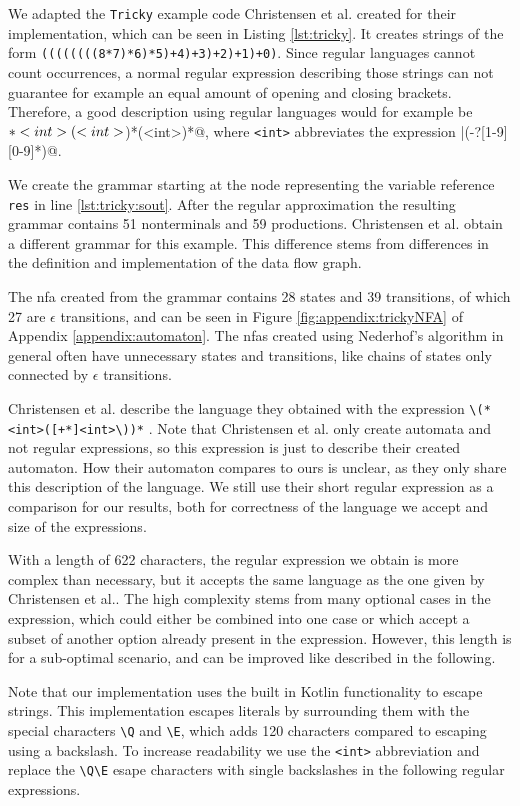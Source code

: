 We adapted the \lstinline|Tricky| example code Christensen et al. \cite{brics} created for their implementation, which can be seen in Listing \ref{lst:tricky}. It creates strings of the form \lstinline|((((((((8*7)*6)*5)+4)+3)+2)+1)+0)|. Since regular languages cannot count occurrences, a normal regular expression describing those strings can not guarantee for example an equal amount of opening and closing brackets. Therefore, a good description using regular languages would for example be \Verb@\(*<int>(\*<int>\))*(\+<int>\))*@, where \Verb|<int>| abbreviates the expression |(-?[1-9][0-9]*)@.

We create the grammar starting at the node representing the variable reference \lstinline|res| in line \ref{lst:tricky:sout}.
After the regular approximation the resulting grammar contains 51 nonterminals and 59 productions.
Christensen et al. obtain a different grammar for this example. This difference stems from differences in the definition and implementation of the data flow graph.

The \ac{nfa} created from the grammar contains 28 states and 39 transitions, of which 27 are $\epsilon$ transitions, and can be seen in Figure \ref{fig:appendix:trickyNFA} of Appendix \ref{appendix:automaton}.
The \acp{nfa} created using Nederhof's algorithm in general often have unnecessary states and transitions, like chains of states only connected by $\epsilon$ transitions.

Christensen et al. describe the language they obtained with the expression \Verb|\(*<int>([+*]<int>\))*| \cite{brics}. Note that Christensen et al. only create automata and not regular expressions, so this expression is just to describe their created automaton. How their automaton compares to ours is unclear, as they only share this description of the language. We still use  their short regular expression as a comparison for our results, both for correctness of the language we accept and size of the expressions.

With a length of 622 characters, the regular expression we obtain is more complex than necessary, but it accepts the same language as the one given by Christensen et al.. 
The high complexity stems from many optional cases in the expression, which could either be combined into one case or which accept a subset of another option already present in the expression.
However, this length is for a sub-optimal scenario, and can be improved like described in the following.

Note that our implementation uses the built in Kotlin functionality to escape strings. This implementation escapes literals by surrounding them with the special characters \lstinline|\Q| and \lstinline|\E|, which adds 120 characters compared to escaping using a backslash.
To increase readability we use the \lstinline|<int>| abbreviation and replace the \lstinline|\Q\E| esape characters with single backslashes in the following regular expressions.

